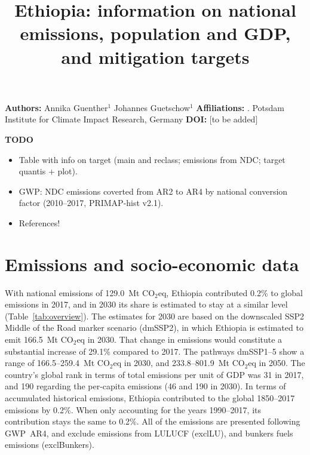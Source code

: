 \documentclass[12pt]{article}
\title{ \bfseries \color{PIKorange} Ethiopia: information on national emissions, population and GDP, and mitigation targets}
\begin{document}
 \maketitle

 \noindent \textbf{Authors:} \newline
 \indent Annika Guenther$^{1}$ \newline
 \indent Johannes Guetschow$^{1}$ \newline
 \noindent \textbf{Affiliations:} \newline
 . Potsdam Institute for Climate Impact Research, Germany \newline
 \noindent \textbf{DOI:} [to be added] \newline

 \textbf{TODO}
 \begin{itemize}
 \item Table with info on target (main and reclass; emissions from NDC; target quantis + plot).
 \item GWP: NDC emissions coverted from AR2 to AR4 by national conversion factor (2010--2017, PRIMAP-hist v2.1).
 \item References!
 \end{itemize}

 \newpage %
 \section{Emissions and socio-economic data}
 \label{sec:nonLULUCFSocioEco}
 With national emissions of 129.0~Mt CO$_2$eq, Ethiopia contributed 0.2\% to global emissions in 2017, and in 2030 its share is estimated to stay at a similar level (Table~\ref{tab:overview}).
 The estimates for 2030 are based on the downscaled SSP2 Middle of the Road marker scenario (dmSSP2), in which Ethiopia is estimated to emit 166.5~Mt CO$_2$eq in 2030.
 That change in emissions would constitute a substantial increase of 29.1\% compared to 2017. 
 The pathways dmSSP1--5 show a range of 166.5--259.4~Mt CO$_2$eq in 2030, and 233.8--801.9~Mt CO$_2$eq in 2050.
 The country's global rank in terms of total emissions per unit of GDP was 31 in 2017, and 190 regarding the per-capita emissions (46 and 190 in 2030).
 In terms of accumulated historical emissions, Ethiopia contributed to the global 1850--2017 emissions by 0.2\%. 
 When only accounting for the years 1990--2017, its contribution stays the same to 0.2\%.
 All of the emissions are presented following GWP~AR4, and exclude emissions from LULUCF (exclLU), and bunkers fuels emissions (exclBunkers).
\end{document}
